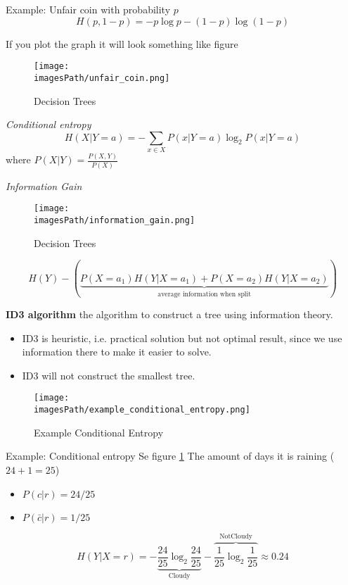 \documentclass{article}
\newcommand{\imagesPath}{images}
\begin{document}
\begin{exampleblock}{Example: Unfair coin with probability $p$}
   \begin{equation*}
       H(p, 1-p) = -p\log p -(1-p)\log(1-p)
   \end{equation*} 

   If you plot the graph it will look something like figure 
\end{exampleblock}
\begin{figure}[!h]
    \centering
    \texttt{[image: \\imagesPath/unfair\_coin.png]}
    \caption{Decision Trees}
\end{figure}

\textit{Conditional entropy}
\begin{equation*}
    H(X|Y=a) = -\sum_{x\in X}P(x|Y=a)\log_2 P(x|Y=a)
\end{equation*}
where $P(X|Y) = \frac{P(X,Y)}{P(X)}$

\textit{Information Gain}
\begin{figure}[!h]
    \centering
    \texttt{[image: \\imagesPath/information\_gain.png]}
    \caption{Decision Trees}
\end{figure}

\begin{equation*}
    H(Y) - \left( \underbrace{P(X=a_1)H(Y|X=a_1) + P(X=a_2)H(Y|X=a_2)}_{\text{average information when split}} \right)
\end{equation*}

\textbf{ID3 algorithm} the algorithm to construct a tree using information
theory.
\begin{itemize}
    \item ID3 is heuristic, i.e. practical solution but not optimal result, since we use information there to make it easier to solve.
    \item ID3 will not construct the smallest tree.
\end{itemize}

\begin{figure}[!h]
    \centering
    \texttt{[image: \\imagesPath/example\_conditional\_entropy.png]}
    \caption{Example Conditional Entropy}
    \label{fig:example_conditional_entropy}
\end{figure}
\begin{exampleblock}{Example: Conditional entropy}
    Se figure \ref{fig:example_conditional_entropy}
    The amount of days it is raining ($24+1=25$)
    \begin{itemize}
        \item $P(c|r) = 24/25$
        \item $P(\bar{c}|r) = 1/25$ 
    \end{itemize}
    
    \begin{equation*}
        H(Y|X=r) = -\underbrace{\frac{24}{25}\log_2\frac{24}{25}}_{\text{Cloudy}} - \overbrace{\frac{1}{25}\log_2\frac{1}{25}}^{\text{NotCloudy}} \approx 0.24
    \end{equation*}
\end{exampleblock}
\end{document}
